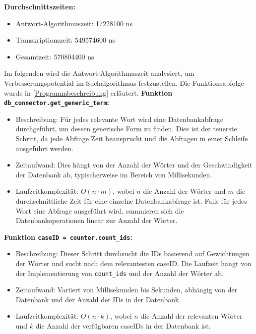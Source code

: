 \textbf{Durchschnittszeiten:}
\begin{itemize}
    \item Antwort-Algorithmuszeit: 17228100 ns
    \item Transkriptionszeit: 549574600 ns
    \item Gesamtzeit: 570804400 ns
\end{itemize}
Im folgenden wird die Antwort-Algorithmuszeit analysiert, um Verbesserungspotential im Suchalgorithmus festzustellen. 
Die Funktionsabfolge wurde in \ref{Programmbeschreibung} erläutert. 
\textbf{Funktion \lstinline|db_connector.get_generic_term|:}
\begin{itemize}
    \item Beschreibung: Für jedes relevante Wort wird eine Datenbankabfrage durchgeführt, um dessen generische Form zu finden. Dies ist der teuerste Schritt, da jede Abfrage Zeit beansprucht und die Abfragen in einer Schleife ausgeführt werden.
    \item Zeitaufwand: Dies hängt von der Anzahl der Wörter und der Geschwindigkeit der Datenbank ab, typischerweise im Bereich von Millisekunden.
    \item Laufzeitkomplexität: \( O(n \cdot m) \), wobei \( n \) die Anzahl der Wörter und \( m \) die durchschnittliche Zeit für eine einzelne Datenbankabfrage ist. Falls für jedes Wort eine Abfrage ausgeführt wird, summieren sich die Datenbankoperationen linear zur Anzahl der Wörter.
\end{itemize}


\textbf{Funktion \lstinline|caseID = counter.count_ids|:}
\begin{itemize}
    \item Beschreibung: Dieser Schritt durchsucht die IDs basierend auf Gewichtungen der Wörter und sucht nach dem relevantesten caseID. Die Laufzeit hängt von der Implementierung von \lstinline|count_ids| und der Anzahl der Wörter ab.
    \item Zeitaufwand: Variiert von Millisekunden bis Sekunden, abhängig von der Datenbank und der Anzahl der IDs in der Datenbank.
    \item Laufzeitkomplexität: \( O(n \cdot k) \), wobei \( n \) die Anzahl der relevanten Wörter und \( k \) die Anzahl der verfügbaren caseIDs in der Datenbank ist. 
\end{itemize}

